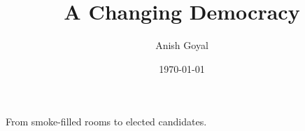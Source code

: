 \documentclass[man]{apa7}
\title{A Changing Democracy}
\author{Anish Goyal}
\affiliation{Gwinnett School of Math\comma{} Science\comma{} and Technology}
\date{\today}
\begin{document}
\maketitle

\huge
From smoke-filled rooms to elected candidates.
\end{document}

